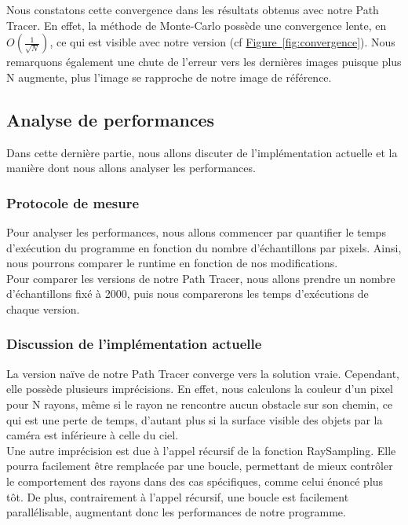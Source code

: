 Nous constatons cette convergence dans les résultats obtenus avec notre Path Tracer.
En effet, la méthode de Monte-Carlo possède une convergence lente, en $O\left(\frac{1}{\sqrt N}\right)$, ce qui est visible avec notre version (cf \hyperref[fig:res_path_tracer]{Figure~\ref*{fig:convergence}}). Nous remarquons également une chute de l'erreur vers les dernières images puisque plus N augmente, plus l'image se rapproche de notre image de référence.\\

\subsection{Analyse de performances}
Dans cette dernière partie, nous allons discuter de l'implémentation actuelle et la manière dont nous allons analyser les performances.\\

\subsubsection{Protocole de mesure}

Pour analyser les performances, nous allons commencer par quantifier le temps d'exécution du programme en fonction du nombre d'échantillons par pixels. Ainsi, nous pourrons comparer le runtime en fonction de nos modifications.\\
Pour comparer les versions de notre Path Tracer, nous allons prendre un nombre d'échantillons fixé à 2000, puis nous comparerons les temps d'exécutions de chaque version.\\

\subsubsection{Discussion de l'implémentation actuelle}

La version naïve de notre Path Tracer converge vers la solution vraie. Cependant, elle possède plusieurs imprécisions. En effet, nous calculons la couleur d'un pixel pour N rayons, même si le rayon ne rencontre aucun obstacle sur son chemin, ce qui est une perte de temps, d'autant plus si la surface visible des objets par la caméra est inférieure à celle du ciel.\\
Une autre imprécision est due à l'appel récursif de la fonction RaySampling. Elle pourra facilement être remplacée par une boucle, permettant de mieux contrôler le comportement des rayons dans des cas spécifiques, comme celui énoncé plus tôt. De plus, contrairement à l'appel récursif, une boucle est facilement parallélisable, augmentant donc les performances de notre programme.\\

